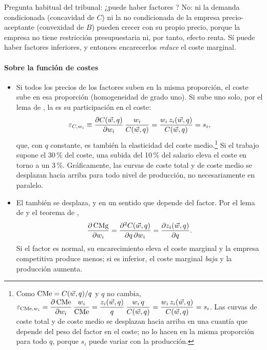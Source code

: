 \documentclass[11pt]{article}
\begin{document}
\begin{notaopositor}
Pregunta habitual del tribunal: ¿puede haber factores ? No: ni la demanda condicionada (concavidad de $C$) ni la no condicionada de la empresa precio-aceptante (convexidad de $B$) pueden crecer con su propio precio, porque la empresa no tiene restricción presupuestaria ni, por tanto, efecto renta. Sí puede haber factores inferiores, y entonces encarecerlos \emph{reduce} el coste marginal.
\end{notaopositor}

\paragraph{Sobre la función de costes}

\begin{itemize}
\item Si todos los precios de los factores suben en la misma proporción, el coste sube en esa proporción (homogeneidad de grado uno). Si sube uno solo, por el lema de , la  es su participación en el coste:
  \begin{equation}
  \varepsilon_{C,w_i}\equiv\frac{\partial C(\vec{w},q)}{\partial w_i}\,\frac{w_i}{C(\vec{w},q)}=\frac{w_i\,z_i(\vec{w},q)}{C(\vec{w},q)}=s_i, \label{eq:elasticidad-coste-precio}
  \end{equation}
  que, con $q$ constante, es también la elasticidad del coste medio.\footnote{Como $\mathrm{CMe}=C(\vec{w},q)/q$ y $q$ no cambia, $\varepsilon_{\mathrm{CMe},w_i}=\dfrac{\partial\,\mathrm{CMe}}{\partial w_i}\,\dfrac{w_i}{\mathrm{CMe}}=\dfrac{z_i(\vec{w},q)}{q}\,\dfrac{w_i\,q}{C(\vec{w},q)}=\dfrac{w_i\,z_i(\vec{w},q)}{C(\vec{w},q)}=s_i$. Las curvas de coste total y de coste medio se desplazan hacia arriba en una cuantía que depende del peso del factor en el coste; no lo hacen en la misma proporción para todo $q$, porque $s_i$ puede variar con la producción.} Si el trabajo supone el 30\,\% del coste, una subida del 10\,\% del salario eleva el coste en torno a un 3\,\%. Gráficamente, las curvas de coste total y de coste medio se desplazan hacia arriba para todo nivel de producción, no necesariamente en paralelo.
\item El  también se desplaza, y en un sentido que depende del factor. Por el lema de  y el teorema de ,
  \begin{equation}
  \frac{\partial\,\mathrm{CMg}}{\partial w_i}=\frac{\partial^2C(\vec{w},q)}{\partial q\,\partial w_i}=\frac{\partial z_i(\vec{w},q)}{\partial q}. \label{eq:cmg-precio}
  \end{equation}
  Si el factor es normal, su encarecimiento eleva el coste marginal y la empresa competitiva produce menos; si es inferior, el coste marginal \emph{baja} y la producción aumenta\nocite{GravelleRees2004Microeconomics}.
\end{itemize}
\end{document}
